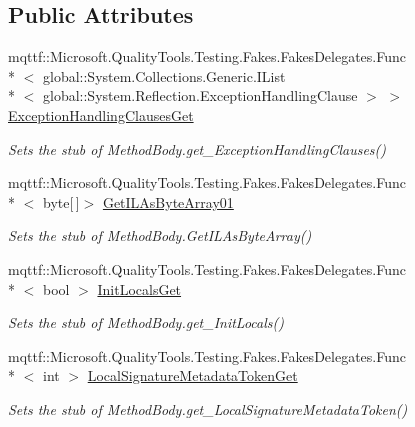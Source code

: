 \subsection*{Public Attributes}
\begin{DoxyCompactItemize}
\item 
mqttf\-::\-Microsoft.\-Quality\-Tools.\-Testing.\-Fakes.\-Fakes\-Delegates.\-Func\\*
$<$ global\-::\-System.\-Collections.\-Generic.\-I\-List\\*
$<$ global\-::\-System.\-Reflection.\-Exception\-Handling\-Clause $>$ $>$ \hyperlink{class_system_1_1_reflection_1_1_fakes_1_1_stub_method_body_a3d85a2afc5d5161227237744fe474d13}{Exception\-Handling\-Clauses\-Get}
\begin{DoxyCompactList}\small\item\em Sets the stub of Method\-Body.\-get\-\_\-\-Exception\-Handling\-Clauses()\end{DoxyCompactList}\item 
mqttf\-::\-Microsoft.\-Quality\-Tools.\-Testing.\-Fakes.\-Fakes\-Delegates.\-Func\\*
$<$ byte\mbox{[}$\,$\mbox{]}$>$ \hyperlink{class_system_1_1_reflection_1_1_fakes_1_1_stub_method_body_a50925380d3963b2073e054fcacfa104d}{Get\-I\-L\-As\-Byte\-Array01}
\begin{DoxyCompactList}\small\item\em Sets the stub of Method\-Body.\-Get\-I\-L\-As\-Byte\-Array()\end{DoxyCompactList}\item 
mqttf\-::\-Microsoft.\-Quality\-Tools.\-Testing.\-Fakes.\-Fakes\-Delegates.\-Func\\*
$<$ bool $>$ \hyperlink{class_system_1_1_reflection_1_1_fakes_1_1_stub_method_body_a6d6096a6139005f42be93bcfbf05a36f}{Init\-Locals\-Get}
\begin{DoxyCompactList}\small\item\em Sets the stub of Method\-Body.\-get\-\_\-\-Init\-Locals()\end{DoxyCompactList}\item 
mqttf\-::\-Microsoft.\-Quality\-Tools.\-Testing.\-Fakes.\-Fakes\-Delegates.\-Func\\*
$<$ int $>$ \hyperlink{class_system_1_1_reflection_1_1_fakes_1_1_stub_method_body_a5fc5c98144baf1db1e7d98a6c39e3bd0}{Local\-Signature\-Metadata\-Token\-Get}
\begin{DoxyCompactList}\small\item\em Sets the stub of Method\-Body.\-get\-\_\-\-Local\-Signature\-Metadata\-Token()\end{DoxyCompactList}\item 

\end{DoxyCompactItemize}

